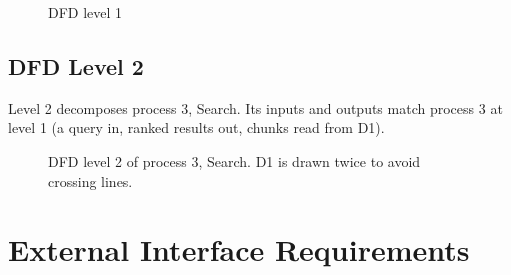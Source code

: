 \begin{figure}[H]
\centering

\caption{DFD level 1}
\label{fig:dfd1}
\end{figure}

\subsection{DFD Level 2}

Level 2 decomposes process 3, Search. Its inputs and outputs match process 3
at level 1 (a query in, ranked results out, chunks read from D1).

\begin{figure}[H]
\centering

\caption{DFD level 2 of process 3, Search. D1 is drawn twice to avoid crossing lines.}
\label{fig:dfd2}
\end{figure}

\section{External Interface Requirements}
\label{sec:interfaces}

